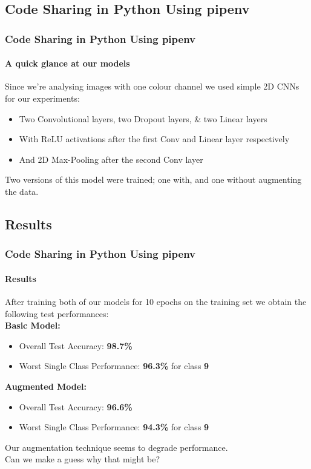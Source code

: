 \documentclass{beamer}
\begin{document}
\subsection{Code Sharing in Python Using pipenv}
\begin{frame}
\frametitle{Code Sharing in Python Using pipenv}
\framesubtitle{A quick glance at our models}
Since we're analysing images with one colour channel we used simple 2D CNNs for our experiments: 
\begin{itemize}
    \item Two Convolutional layers, two Dropout layers, \& two Linear layers
    \item With ReLU activations after the first Conv and Linear layer respectively
    \item And 2D Max-Pooling after the second Conv layer
\end{itemize}
Two versions of this model were trained; one with, and one without augmenting the data.
\end{frame}


\subsection{Results}
\begin{frame}
\frametitle{Code Sharing in Python Using pipenv}
\framesubtitle{Results}
After training both of our models for 10 epochs on the training set we obtain the following test performances:\\
\medskip
\textbf{Basic Model:}
\begin{itemize}
    \item Overall Test Accuracy: \textbf{98.7\%}
    \item Worst Single Class Performance: \textbf{96.3\%} for class \textbf{9}
\end{itemize}
\textbf{Augmented Model:}
\begin{itemize}
    \item Overall Test Accuracy: \textbf{96.6\%}
    \item Worst Single Class Performance: \textbf{94.3\%} for class \textbf{9}
\end{itemize}
Our augmentation technique seems to degrade performance.\\ Can we make a guess why that might be?
\end{frame}
\end{document}
